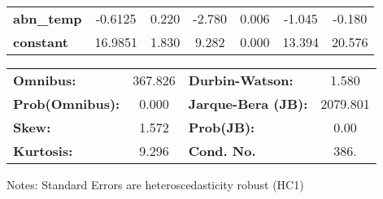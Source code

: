 \begin{center}
\begin{tabular}{lcccccc}
\textbf{abn\_temp}       &      -0.6125  &        0.220     &    -2.780  &         0.006        &       -1.045    &       -0.180     \\
\textbf{constant}        &      16.9851  &        1.830     &     9.282  &         0.000        &       13.394    &       20.576     \\
\bottomrule
\end{tabular}
\begin{tabular}{lclc}
\textbf{Omnibus:}       & 367.826 & \textbf{  Durbin-Watson:     } &    1.580  \\
\textbf{Prob(Omnibus):} &   0.000 & \textbf{  Jarque-Bera (JB):  } & 2079.801  \\
\textbf{Skew:}          &   1.572 & \textbf{  Prob(JB):          } &     0.00  \\
\textbf{Kurtosis:}      &   9.296 & \textbf{  Cond. No.          } &     386.  \\
\bottomrule
\end{tabular}
\end{center}

Notes: \newline
 [1] Standard Errors are heteroscedasticity robust (HC1)